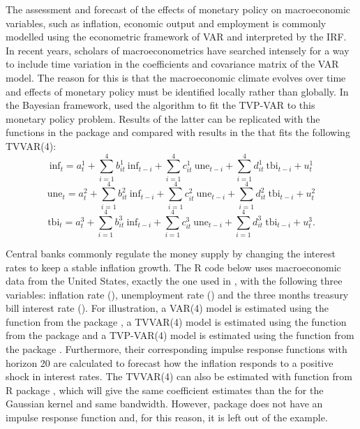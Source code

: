 The assessment and forecast of the effects of monetary policy on macroeconomic variables, such as inflation, economic output and employment is commonly modelled using the econometric framework of VAR and interpreted by the IRF. In recent years, scholars of macroeconometrics have searched intensely for a way to include time variation in the coefficients and covariance matrix of the VAR model. The reason for this is that the macroeconomic climate evolves over time and effects of monetary policy must be identified locally rather than globally.  In the Bayesian framework, \citet{Primiceri2005} used the \citet{CarterKohn1994} algorithm to fit the TVP-VAR to this monetary policy problem. Results of the latter can be replicated with the functions in the package  and compared with results in the  that fits the following TVVAR(4):
$$
\text{inf}_t = a_{t}^1 +\sum_{i=1}^4 b_{it}^ 1 \ \text{inf}_{t-i} +\sum_{i=1}^4 c_{it}^1 \ \text{une}_{t-i} +\sum_{i=1}^4 d_{it}^1\ \text{tbi}_{t-i} +u _{t}^1
$$
$$
\text{une}_t = a_{t}^2 +\sum_{i=1}^4 b_{it}^ 2 \ \text{inf}_{t-i} +\sum_{i=1}^4 c_{it}^2 \ \text{une}_{t-i} +\sum_{i=1}^4 d_{it}^2 \ \text{tbi}_{t-i} +u _{t}^2
$$
$$
\text{tbi}_t = a_{t}^3 +\sum_{i=1}^4 b_{it}^ 3 \ \text{inf}_{t-i} +\sum_{i=1}^4 c_{it}^3 \ \text{une}_{t-i} +\sum_{i=1}^4 d_{it}^3\ \text{tbi}_{t-i} +u _{t}^3.
$$

Central banks commonly regulate the money supply by changing the interest rates to keep a stable inflation growth. The R code below uses macroeconomic data from the United States, exactly the one used in \citet{Primiceri2005}, with the following three variables: inflation rate (), unemployment rate () and the three months treasury bill interest rate (). For illustration, a VAR(4) model is estimated using the function  from the package , a TVVAR(4) model is estimated using the function  from the package  and a TVP-VAR(4) model is estimated using  the function  from the package . Furthermore, their corresponding impulse response functions with horizon 20 are calculated to forecast how the inflation responds to a positive shock in interest rates. The TVVAR(4) can also be estimated with function  from R package , which will give the same coefficient estimates than the  for the Gaussian kernel and same bandwidth. However, package  does not have an impulse response function and, for this reason, it is left out of the example.

